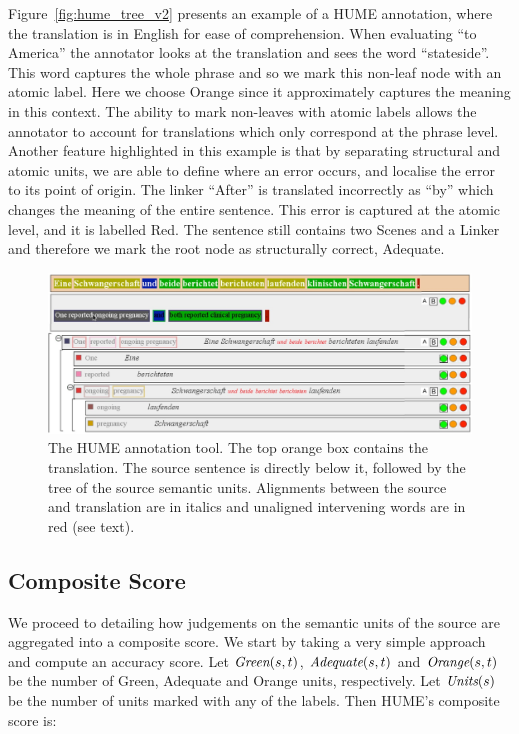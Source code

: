 \documentclass[11pt,letterpaper]{article}
\def\func#1{\text{\it #1}}  %
\def\Adequate{\func{Adequate}}
\def\Green{\func{Green}}
\def\Orange{\func{Orange}}
\def\Units{\func{Units}}
\begin{document}
Figure~\ref{fig:hume_tree_v2} presents an example of a HUME
annotation, where the translation is in English for ease of comprehension.
When evaluating ``to America'' the annotator looks at the translation and sees the
word ``stateside''. This word captures the whole phrase and so we mark this
non-leaf node with an atomic label. Here we choose Orange since
it approximately captures the meaning in this context.
The ability to mark non-leaves with atomic labels allows
the annotator to account for translations which only correspond at the phrase
level. Another feature highlighted in this example is that by separating structural
and atomic units, we are able to define where an error occurs, and localise
the error to its point of origin. The linker ``After'' is translated incorrectly as ``by''
which changes the meaning of the entire sentence. This error is captured at
the atomic level, and it is labelled Red. The sentence still contains two Scenes and
a Linker and therefore we mark the root node as structurally correct, Adequate.

\begin{figure}[t]
    \begin{center}
    \includegraphics[width=.8\textwidth]{hume_interface2.jpg}
    \caption{The HUME annotation tool. The top orange box
      contains the translation. The source sentence is directly below it, followed by the tree of the source
      semantic units. Alignments between the source and translation are in italics and
      unaligned intervening words are in red (see text).}
    \label{fig:interface}
    \end{center}
\end{figure}


\subsection{Composite Score}\label{sec:score}

We proceed to detailing how judgements on the semantic units
of the source are aggregated into a composite score. 
We start by taking a very simple approach and compute an accuracy score.
Let $\Green(s,t)$, $\Adequate(s,t)$ and $\Orange(s,t)$ be the number of Green, Adequate and Orange
units, respectively. Let $\Units(s)$ be the number of units marked with any of the labels.
Then HUME's composite score is:
\end{document}
